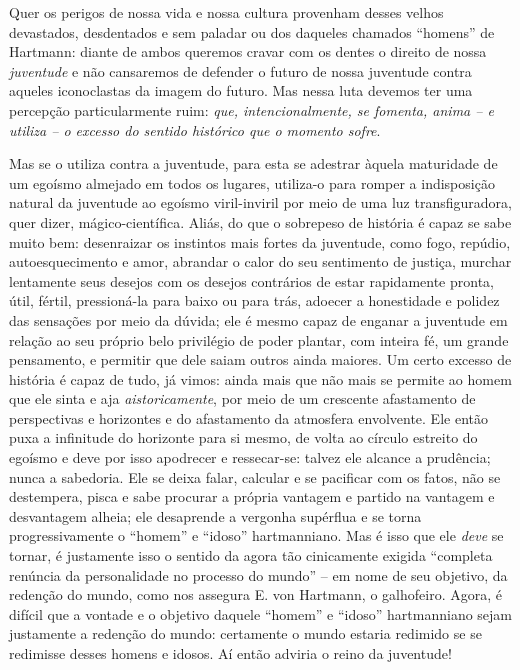   Quer os perigos de nossa vida e nossa cultura provenham desses velhos
  devastados, desdentados e sem paladar ou dos daqueles chamados
  ``homens'' de Hartmann: diante de ambos queremos cravar com os dentes
  o direito de nossa \emph{juventude} e não cansaremos de defender o
  futuro de nossa juventude contra aqueles iconoclastas da imagem do
  futuro. Mas nessa luta devemos ter uma percepção particularmente ruim:
  \emph{que, intencionalmente, se fomenta, anima -- e utiliza -- o
  excesso do sentido histórico que o momento sofre}.

  Mas se o utiliza contra a juventude, para esta se adestrar àquela
  maturidade de um egoísmo almejado em todos os lugares, utiliza-o
  para romper a indisposição natural da juventude ao egoísmo
  viril-inviril por meio de uma luz transfiguradora, quer dizer,
  mágico-científica. Aliás, do que o sobrepeso de história é capaz se
  sabe muito bem: desenraizar os instintos mais fortes da juventude,
  como fogo, repúdio, autoesquecimento e amor, abrandar o calor do seu
  sentimento de justiça, murchar lentamente seus desejos com os desejos
  contrários de estar rapidamente pronta, útil, fértil, pressioná-la
  para baixo ou para trás, adoecer a honestidade e polidez das sensações
  por meio da dúvida; ele é mesmo capaz de enganar a juventude em
  relação ao seu próprio belo privilégio de poder plantar, com inteira
  fé, um grande pensamento, e permitir que dele saiam outros ainda
  maiores. Um certo excesso de história é capaz de tudo, já vimos: ainda
  mais que não mais se permite ao homem que ele sinta e aja
  \emph{aistoricamente}, por meio de um crescente afastamento de
  perspectivas e horizontes e do afastamento da atmosfera envolvente.
  Ele então puxa a infinitude do horizonte para si mesmo, de volta ao
  círculo estreito do egoísmo e deve por isso apodrecer e ressecar-se:
  talvez ele alcance a prudência; nunca a sabedoria. Ele se deixa falar,
  calcular e se pacificar com os fatos, não se destempera, pisca e sabe
  procurar a própria vantagem e partido na vantagem e desvantagem
  alheia; ele desaprende a vergonha supérflua e se torna
  progressivamente o ``homem'' e ``idoso'' hartmanniano. Mas é isso que
  ele \emph{deve} se tornar, é justamente isso o sentido da agora tão
  cinicamente exigida ``completa renúncia da personalidade no processo
  do mundo'' -- em nome de seu objetivo, da redenção do mundo, como nos
  assegura E. von Hartmann, o galhofeiro. Agora, é difícil que a vontade
  e o objetivo daquele ``homem'' e ``idoso'' hartmanniano sejam
  justamente a redenção do mundo: certamente o mundo estaria redimido se
  se redimisse desses homens e idosos. Aí então adviria o reino da
  juventude!


